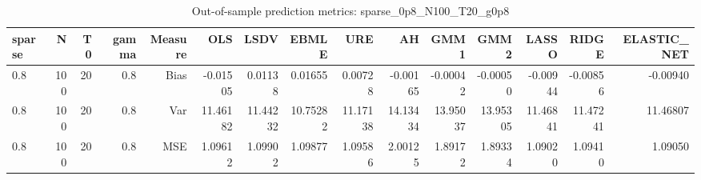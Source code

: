 \begin{table}[!htbp]\centering
\caption{Out-of-sample prediction metrics: sparse_0p8_N100_T20_g0p8}
\label{tab:table3_sparse_0p8_N100_T20_g0p8}
\begin{tabular}{lrrrrrrrrrrrrrr}
\hline
sparse & N & T0 & gamma & Measure & OLS & LSDV & EBMLE & URE & AH & GMM1 & GMM2 & LASSO & RIDGE & ELASTIC_NET \\
\hline
0.8 & 100 & 20 & 0.8 & Bias & -0.01505 & 0.01138 & 0.01655 & 0.00728 & -0.00165 & -0.00042 & -0.00050 & -0.00944 & -0.00856 & -0.00940 \\
0.8 & 100 & 20 & 0.8 & Var & 11.46182 & 11.44232 & 10.75282 & 11.17138 & 14.13434 & 13.95037 & 13.95305 & 11.46841 & 11.47241 & 11.46807 \\
0.8 & 100 & 20 & 0.8 & MSE & 1.09612 & 1.09902 & 1.09877 & 1.09586 & 2.00125 & 1.89172 & 1.89334 & 1.09020 & 1.09410 & 1.09050 \\
\hline
\end{tabular}
\end{table}

